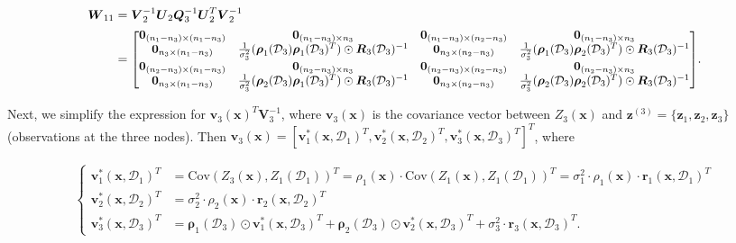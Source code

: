 \documentclass[12pt]{article}
\newcommand{\bs}[1]{\boldsymbol{#1}}
\newcommand*{\Scale}[2][4]{\scalebox{#1}{$#2$}}%
\begin{document}
\begin{align*}
    \bs{W}_{11} &= \bs{V}_2^{-1}\bs{U}_2\bs{Q}_3^{-1}\bs{U}_2^T\bs{V}_2^{-1}\\
    &= \Scale[0.95]{\begin{bmatrix}
        \bs{0}_{(n_1-n_3)\times(n_1-n_3)} & \bs{0}_{(n_1-n_3)\times n_3} & \bs{0}_{(n_1-n_3)\times(n_2-n_3)} & \bs{0}_{(n_1-n_3)\times n_3}\\
        \bs{0}_{n_3\times(n_1-n_3)} & \frac{1}{\sigma_3^2}(\bs{\rho}_1(\mathcal{D}_3)\bs{\rho}_1(\mathcal{D}_3)^T)\odot \bs{R}_3(\mathcal{D}_3)^{-1} & \bs{0}_{n_3\times(n_2-n_3)} & \frac{1}{\sigma_3^2}(\bs{\rho}_1(\mathcal{D}_3)\bs{\rho}_2(\mathcal{D}_3)^T)\odot \bs{R}_3(\mathcal{D}_3)^{-1}\\
        \bs{0}_{(n_2-n_3)\times(n_1-n_3)} & \bs{0}_{(n_2-n_3)\times n_3} & \bs{0}_{(n_2-n_3)\times(n_2-n_3)} & \bs{0}_{(n_2-n_3)\times n_3}\\
        \bs{0}_{n_3\times(n_1-n_3)} & \frac{1}{\sigma_3^2}(\bs{\rho}_2(\mathcal{D}_3)\bs{\rho}_1(\mathcal{D}_3)^T)\odot \bs{R}_3(\mathcal{D}_3)^{-1} & \bs{0}_{n_3\times(n_2-n_3)} & \frac{1}{\sigma_3^2}(\bs{\rho}_2(\mathcal{D}_3)\bs{\rho}_2(\mathcal{D}_3)^T)\odot \bs{R}_3(\mathcal{D}_3)^{-1}\\
    \end{bmatrix}}.
\end{align*}
\normalsize

\sloppy Next, we simplify the expression for $\bs{v}_3(\bs{x})^T\bs{V}_3^{-1}$, where $\bs{v}_3(\bs{x})$ is the covariance vector between $Z_3(\bs{x})$ and $\bs{z}^{(3)}=\{\bs{z}_1,\bs{z}_2,\bs{z}_3\}$ (observations at the three nodes). Then $\bs{v}_3(\bs{x}) = \left[\bs{v}_1^*(\bs{x},\mathcal{D}_1)^T,\bs{v}_2^*(\bs{x},\mathcal{D}_2)^T,\bs{v}_3^*(\bs{x},\mathcal{D}_3)^T\right]^T$, where

\begin{align*}
\begin{cases}
    \bs{v}_1^*(\bs{x},\mathcal{D}_1)^T &= \text{Cov}(Z_3(\bs{x}),Z_1(\mathcal{D}_1))^T = \rho_1(\bs{x})\cdot\text{Cov}(Z_1(\bs{x}),Z_1(\mathcal{D}_1))^T = \sigma_1^2\cdot \rho_1(\bs{x})\cdot \bs{r}_1(\bs{x},\mathcal{D}_1)^T\\
    \bs{v}_2^*(\bs{x},\mathcal{D}_2)^T &= \sigma_2^2\cdot \rho_2(\bs{x})\cdot \bs{r}_2(\bs{x},\mathcal{D}_2)^T\\
    \bs{v}_3^*(\bs{x},\mathcal{D}_3)^T &= \bs{\rho}_1(\mathcal{D}_3)\odot \bs{v}_1^*(\bs{x},\mathcal{D}_3)^T + \bs{\rho}_2(\mathcal{D}_3)\odot \bs{v}_2^*(\bs{x},\mathcal{D}_3)^T + \sigma_3^2\cdot \bs{r}_3(\bs{x},\mathcal{D}_3)^T.
\end{cases}
\end{align*}
\end{document}

